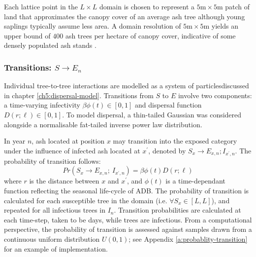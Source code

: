 Each lattice point in the $L\times L$ domain is chosen to represent a $5\mathrm{m}\times5\mathrm{m}$ patch of land that approximates the canopy cover of an average ash tree
\textemdash although young saplings typically assume less area. 
A domain resolution of $5\mathrm{m}\times5\mathrm{m}$ yields an upper bound of $400$ ash trees per hectare of canopy cover, indicative of some densely populated ash stands \cite{ash-tree2, ash-tree1}. %

\subsubsection{Transitions: $S\rightarrow E_n$}

Individual tree-to-tree interactions are modelled as a system of particles\textemdash discussed in chapter \ref{ch5:dispersal-model}.
Transitions from $S$ to $E$ involve two components: a time-varying infectivity $\beta\phi(t)\in [0, 1]$ and dispersal function $D(r; \ell)\in [0, 1]$.
To model dispersal, a thin-tailed Gaussian was considered alongside a normalisable fat-tailed inverse power law distribution.

In year $n$, ash located at position $x$ may transition into the exposed category under the influence of infected ash located at $x^\prime$, denoted by $S_x \rightarrow E_{x,n}; I_{x^\prime, n}$.
The probability of transition follows:
\begin{equation}
    Pr(S_{x} \rightarrow E_{x,n} ;\ I_{x^{\prime}, n} ) = \beta  \phi(t) D(r;\ell)
\end{equation}
where $r$ is the distance between $x$ and $x^{\prime}$, and $\phi(t)$ is a time-dependant function reflecting the seasonal life-cycle of ADB.
The probability of transition is calculated for each susceptible tree in the domain (i.e. $\forall S_x \in [L, L]$),
and repeated for all infectious trees in $I_n$.
Transition probabilities are calculated at each time-step, taken to be days, while trees are infectious.
From a computational perspective, the probability of transition is assessed against samples drawn from a continuous uniform distribution $U(0, 1)$;
see Appendix \ref{a:probablity-transition} for an example of implementation.

